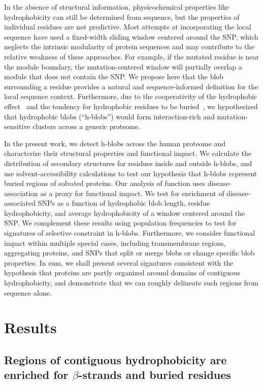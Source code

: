 \documentclass[9pt,twocolumn,twoside,lineno]{pnas-new}
\newcommand{\inserted}[1]{{#1}}
\begin{document}
In the absence of structural information, physicochemical properties like hydrophobicity can still be determined from sequence, but the properties of individual residues are not predictive. Most attempts at incorporating the local sequence have used a fixed-width sliding window centered around the SNP, which neglects the intrinsic modularity of protein sequences and may contribute to the relative weakness of these approaches. For example, if the mutated residue is near the module boundary, the mutation-centered window will partially overlap a module that does not contain the SNP. We propose here that the blob surrounding a residue provides a natural and sequence-informed definition for the local sequence context.  Furthermore, due to the cooperativity of the hydrophobic effect~\citep{Jiang2017} and the tendency for hydrophobic residues to be buried~\citep{Lins2003}, we hypothesized that hydrophobic blobs (``h-blobs'') would form interaction-rich and mutation-sensitive clusters across a generic proteome. 

In the present work, we detect h-blobs across the human proteome and characterize their structural properties and functional impact. \inserted{We calculate the distribution of secondary structures for residues inside and outside h-blobs, and use solvent-accessibility calculations to test our hypothesis that h-blobs represent buried regions of solvated proteins. Our analysis of function uses disease-association as a proxy for functional impact.} We test for enrichment of disease-associated SNPs as a function of hydrophobic blob length, residue hydrophobicity, and average hydrophobicity of a window centered around the SNP. We complement these results using population frequencies to test for signatures of selective constraint in h-blobs. \inserted{Furthermore, we consider functional impact within multiple special cases, including transmembrane regions, aggregating proteins, and SNPs that split or merge blobs or change specific blob properties.} In sum, we shall present several signatures consistent with the hypothesis that proteins are partly organized around domains of contiguous hydrophobicity, and demonstrate that we can roughly delineate such regions from sequence alone. 

\section*{Results}

\subsection*{Regions of contiguous hydrophobicity are enriched for $\beta$-strands and buried residues}
\label{section:1}
\end{document}
